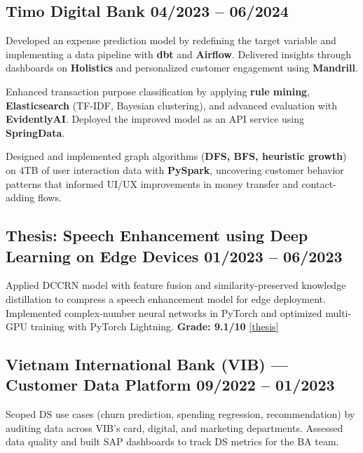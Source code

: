 \subsection{Timo Digital Bank \hfill 04/2023 -- 06/2024}
\begin{zitemize}
\item Developed an expense prediction model by redefining the target variable and implementing a data pipeline with \textbf{dbt} and \textbf{Airflow}. Delivered insights through dashboards on \textbf{Holistics} and personalized customer engagement using \textbf{Mandrill}.
\item Enhanced transaction purpose classification by applying \textbf{rule mining}, \textbf{Elasticsearch} (TF-IDF, Bayesian clustering), and advanced evaluation with \textbf{EvidentlyAI}. Deployed the improved model as an API service using \textbf{SpringData}.
\item Designed and implemented graph algorithms (\textbf{DFS, BFS, heuristic growth}) on 4TB of user interaction data with \textbf{PySpark}, uncovering customer behavior patterns that informed UI/UX improvements in money transfer and contact-adding flows.
\end{zitemize}

\subsection{Thesis: Speech Enhancement using Deep Learning on Edge Devices \hfill 01/2023 -- 06/2023}
\begin{zitemize}
\item Applied DCCRN model with feature fusion and similarity-preserved knowledge distillation to compress a speech enhancement model for edge deployment. Implemented complex-number neural networks in PyTorch and optimized multi-GPU training with PyTorch Lightning. \textbf{Grade: 9.1/10} \href{https://drive.google.com/file/d/1KO6Zd68ePfUTPycaNw94ThQVt2Pkan7s/view?usp=sharing}{[thesis]}
\end{zitemize}

\subsection{Vietnam International Bank (VIB) --- Customer Data Platform \hfill 09/2022 -- 01/2023}
\begin{zitemize}
\item Scoped DS use cases (churn prediction, spending regression, recommendation) by auditing data across VIB's card, digital, and marketing departments. Assessed data quality and built SAP dashboards to track DS metrics for the BA team.
\end{zitemize}
